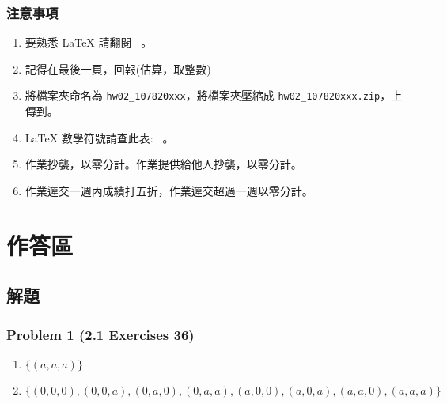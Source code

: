 \documentclass[14pt,hyperref={bookmarks=false}]{beamer}
\begin{document}
	\begin{frame}
	\frametitle{注意事項}
	\fontsize{10}{10pt}\selectfont
	\begin{enumerate}[label=(\alph*)]
	\item 要熟悉 LaTeX 請翻閱 \ 。
	\item 記得在最後一頁，回報\selectfont \color{red}{完成作業小時數}(估算，取整數)\selectfont \color{black}{。}
	\item 將檔案夾命名為 \texttt{hw02\_107820xxx}，將檔案夾壓縮成 \texttt{hw02\_107820xxx.zip}，上傳到。
	\item LaTeX 數學符號請查此表: \ 。
	\item 作業抄襲，以零分計。作業提供給他人抄襲，以零分計。
	\item 作業遲交一週內成績打五折，作業遲交超過一週以零分計。
	\end{enumerate}
	\end{frame}

\section{作答區}

	\subsection{解題}
	
	
	\begin{frame}
	\frametitle{Problem 1 (2.1 Exercises 36)}
	\fontsize{9.5}{10pt}\selectfont
	\begin{enumerate}[label=(\alph*)]
	\item $\{(a, a, a)\}$
	\item $\{(0,0,0),(0,0,a),(0,a,0),(0,a,a),(a,0,0),(a,0,a),(a,a,0),(a,a,a)\}$
	\end{enumerate}
	\end{frame}
	
\end{document}
